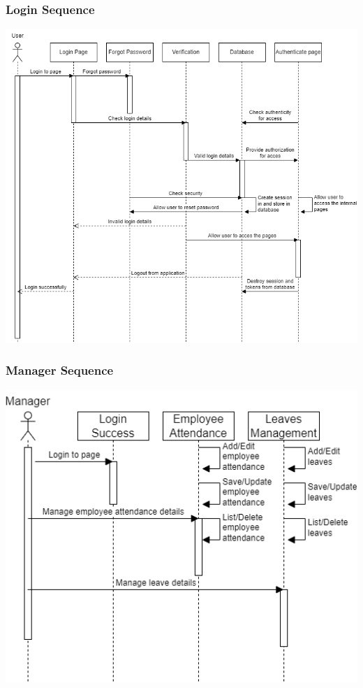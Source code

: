 \documentclass[a4paper, 12pt]{article}
\begin{document}
\subsubsection{Login Sequence}
\begin{center}
\includegraphics[width=1\textwidth]{Login Sequence.png}\par
\end{center}
\subsubsection{Manager Sequence}
\begin{center}
\includegraphics[width=1\textwidth]{Manager Sequence.png}\par
\end{center}
\end{document}
